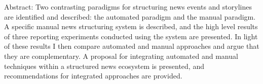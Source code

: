 Abstract: Two contrasting paradigms for structuring news events and storylines are identified and described: the automated paradigm and the manual paradigm. A specific manual news structuring system is described, and the high level results of three reporting experiments conducted using the system are presented. In light of these results I then compare automated and manual approaches and argue that they are complementary. A proposal for integrating automated and manual techniques within a structured news ecosystem is presented, and recommendations for integrated approaches are provided.
